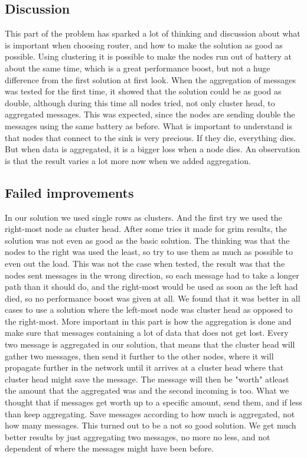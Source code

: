 \documentclass{article}
\begin{document}
  \subsection{Discussion}
    This part of the problem has sparked a lot of thinking and discussion about what
    is important when choosing router, and how to make the solution as good as possible. 
    Using clustering it is possible to make the nodes run out of battery at about the same 
    time, which is a great performance boost, but not a huge difference from the first solution
    at first look. When the aggregation of messages was tested for the first time, it showed that the
    solution could be as good as double, although during this time all nodes tried, not only
    cluster head, to aggregated messages. This was expected, since the nodes are sending double the
    messages using the same battery as before. What is important to understand is 
    that nodes that connect to the sink is very precious. If they die, everything dies. 
    But when data is aggregated, it is a bigger loss when a node dies. An observation
    is that the result varies a lot more now when we added aggregation. 

  \subsection{Failed improvements}
    In our solution we used single rows as clusters. And the first try we used the 
    right-most node as cluster head. After some tries it made for grim results, the solution 
    was not even as good as the basic solution. The thinking was that the nodes
    to the right was used the least, so try to use them as much as possible to
    even out the load. This was not the case when tested, the result was that
    the nodes sent messages in the wrong direction, so each message had to take a 
    longer path than it should do, and the right-most would be used as soon as the
    left had died, so no performance boost was given at all. We found that it
    was better in all cases to use a solution where the left-most node was cluster head 
    as opposed to the right-most. More important in this part is how the aggregation 
    is done and make sure that messages containing a lot of data that does not get lost.
    Every two message is aggregated in our solution, that means that the cluster head will
    gather two messages, then send it further to the other nodes, where it will propagate
    further in the network until it arrives at a cluster head where that cluster head
    might save the message. The message will then be "worth" atleast the amount that 
    the aggregated was and the second incoming is too. What we thought that if messages
    get worth up to a specific amount, send them, and if less than keep aggregating. 
    Save messages according to how much is aggregated, not how many messages. 
    This turned out to be a not so good solution. We get much better results by just 
    aggregating two messages, no more no less, and not dependent of where the messages 
    might have been before.
\end{document}
